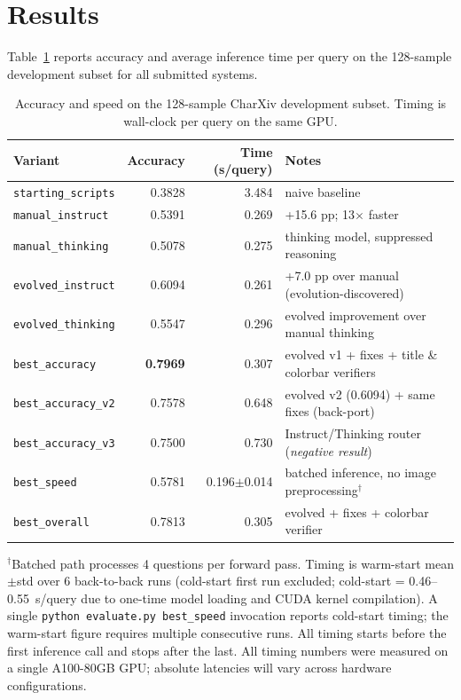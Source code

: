 \documentclass{article}
\begin{document}
\section{Results}

Table~\ref{tab:results} reports accuracy and average inference time per query
on the 128-sample development subset for all submitted systems.

\begin{table}[h]
\centering
\caption{Accuracy and speed on the 128-sample CharXiv development subset.
Timing is wall-clock per query on the same GPU.}
\label{tab:results}
\begin{tabular}{lrrl}
\toprule
Variant & Accuracy & Time (s/query) & Notes \\
\midrule
\texttt{starting\_scripts} & 0.3828 & 3.484 & naive baseline \\
\texttt{manual\_instruct}  & 0.5391 & 0.269 & +15.6 pp; 13$\times$ faster \\
\texttt{manual\_thinking}  & 0.5078 & 0.275 & thinking model, suppressed reasoning \\
\texttt{evolved\_instruct} & 0.6094 & 0.261 & +7.0 pp over manual (evolution-discovered) \\
\texttt{evolved\_thinking} & 0.5547 & 0.296 & evolved improvement over manual thinking \\
\midrule
\texttt{best\_accuracy}    & \textbf{0.7969} & 0.307 & evolved v1 + fixes + title \& colorbar verifiers \\
\texttt{best\_accuracy\_v2}& 0.7578 & 0.648 & evolved v2 (0.6094) + same fixes (back-port) \\
\texttt{best\_accuracy\_v3}& 0.7500 & 0.730 & Instruct/Thinking router (\emph{negative result}) \\
\texttt{best\_speed}       & 0.5781 & 0.196$\pm$0.014 & batched inference, no image preprocessing$^\dagger$ \\
\texttt{best\_overall}     & 0.7813 & 0.305 & evolved + fixes + colorbar verifier \\
\bottomrule
\end{tabular}

\smallskip
{\small $^\dagger$Batched path processes 4 questions per forward pass.
Timing is
warm-start mean$\pm$std over 6 back-to-back runs
(cold-start first run excluded; cold-start = 0.46--0.55~s/query due to
one-time model loading and CUDA kernel compilation).
A single \texttt{python evaluate.py best\_speed} invocation reports
cold-start timing; the warm-start figure requires multiple consecutive runs.
All timing starts before the first inference call and stops after the last.
All timing numbers were measured on a single A100-80GB GPU; absolute
latencies will vary across hardware configurations.}
\end{table}
\end{document}
